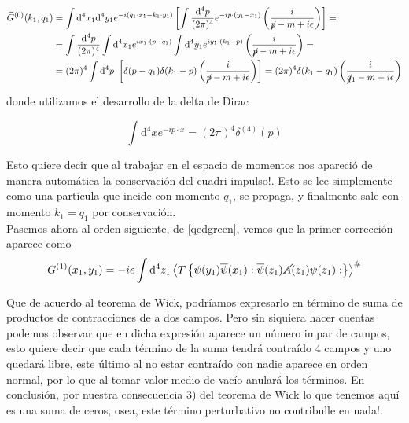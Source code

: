 \documentclass{article}
\numberwithin{equation}{section}
\begin{document}
\begin{equation}\label{g0fourier}
\begin{aligned}
\widetilde{G}^{(0)}(k_{1},q_{1})&= \int \mathrm{\mathrm{d^4}}x_{1}\mathrm{\mathrm{d^4}}y_{1} e^{-i(q_1\cdot x_1 - k_1\cdot y_1)}\left[ \int\frac{\mathrm{d^4}p}{(2\pi)^{4}}e^{-ip\cdot(y_{1}-x_{1})}\left(\frac{i}{\cancel{p}-m+i\epsilon}\right) \right] =\\
&=\int\frac{\mathrm{d^4}p}{(2\pi)^{4}} \int \mathrm{d^4}x_{1} e^{ix_1\cdot(p-q_1)} \int \mathrm{d^4}y_{1} e^{iy_1\cdot(k_1-p)} \left(\frac{i}{\cancel{p}-m+i\epsilon}\right) =\\
&=(2\pi)^{4}\int \mathrm{d^4}p \ \left[\delta(p-q_{1})\delta(k_1-p)\left(\frac{i}{\cancel{p}-m+i\epsilon}\right)\right]=(2\pi)^{4}\delta(k_{1}-q_{1})\left(\frac{i}{\cancel{q}_{1}-m+i\epsilon}\right)
\end{aligned}
\end{equation}

donde utilizamos el desarrollo de la delta de Dirac

\begin{equation}\label{key}
\int \mathrm{d^4}x e^{-ip \cdot x} = \left(2 \pi\right)^4 \delta^{(4)}(p)
\end{equation}

Esto quiere decir que al trabajar en el espacio de momentos nos apareció de
manera automática la conservación del cuadri-impulso!. Esto se lee
simplemente como una partícula que incide con momento $q_{1}$,
se propaga, y finalmente sale con momento $ k_1=q_1 $ por conservación.\\

Pasemos ahora al orden siguiente,
de \ref{qedgreen}, vemos que la primer corrección aparece como
\begin{equation}
G^{(1)}(x_{1},y_{1})=-ie\int \mathrm{d^4}z_{1}\left\langle T\left\{ \psi(y_{1})\overline{\psi}(x_{1}):\overline{\psi}(z_{1})\cancel{A}(z_{1})\psi(z_{1}):\right\} \right\rangle ^{\#}
\end{equation}

Que de acuerdo al teorema de Wick, podríamos expresarlo en término
de suma de productos de contracciones de a dos campos. Pero sin siquiera
hacer cuentas podemos observar que en dicha expresión aparece un número
impar de campos, esto quiere decir que cada término de la suma tendrá
contraído 4 campos y uno quedará libre, este último al no estar contraído
con nadie aparece en orden normal, por lo que al tomar valor medio
de vacío anulará los términos. En conclusión, por nuestra consecuencia
3) del teorema de Wick lo que tenemos aquí es una suma de ceros, osea,
este término perturbativo no contribulle en nada!.\\
\end{document}
